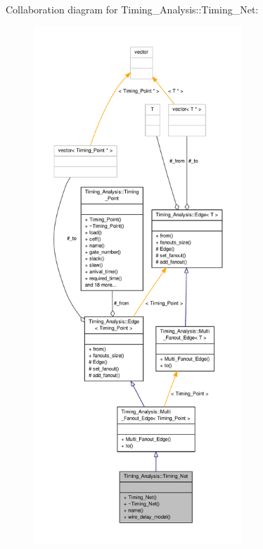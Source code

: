 Collaboration diagram for Timing\-\_\-\-Analysis\-:\-:Timing\-\_\-\-Net\-:\nopagebreak
\begin{figure}[H]
\begin{center}
\leavevmode
\includegraphics[height=550pt]{classTiming__Analysis_1_1Timing__Net__coll__graph}
\end{center}
\end{figure}
